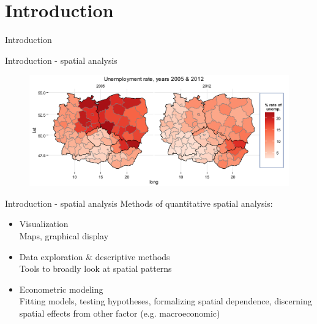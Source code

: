 \documentclass{beamer}
\begin{document}
\section{Introduction}
\begin{frame}{Introduction}
\end{frame}
\begin{frame}{Introduction - spatial analysis}
\begin{figure}
	\includegraphics[width=.9\textwidth]{IMG/sp_auto2.PNG}
\end{figure}
\end{frame}
\begin{frame}{Introduction - spatial analysis}
Methods of quantitative spatial analysis:\\
\bigskip
\begin{itemize}
    \item Visualization \\Maps, graphical display
    \bigskip
    \item Data exploration \& descriptive methods \\Tools to broadly look at spatial patterns
    \bigskip
    \item Econometric modeling \\Fitting models, testing hypotheses, formalizing spatial dependence, discerning spatial effects from other factor (e.g. macroeconomic)
\end{itemize}
\end{frame}
\end{document}
